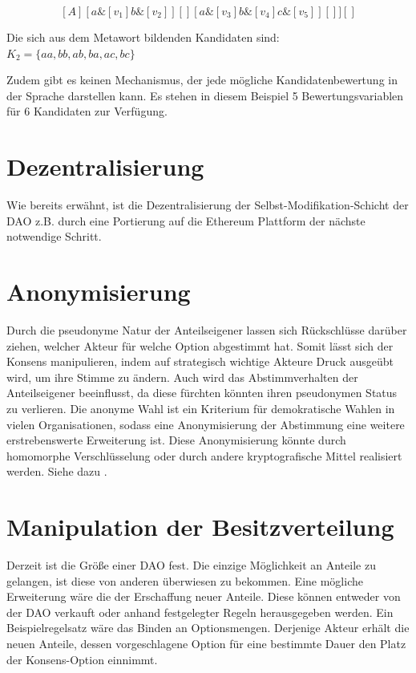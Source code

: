 \documentclass[a4paper,12pt]{report}
\begin{document}
\[ [A][ a\&[v_1]b\&[v_2] ][][ a\&[v_3]b\&[v_4]c\&[v_5] ][] ][] \] 


Die sich aus dem Metawort bildenden Kandidaten sind: $K_2=\{ aa, bb, ab, ba, ac, bc \}$

Zudem gibt es keinen Mechanismus, der jede mögliche Kandidatenbewertung in der Sprache darstellen kann. Es stehen in diesem Beispiel 5 Bewertungsvariablen für 6 Kandidaten zur Verfügung. 

\section{Dezentralisierung}
Wie bereits erwähnt, ist die Dezentralisierung der Selbst-Modifikation-Schicht der DAO z.B. durch eine Portierung auf die Ethereum Plattform der nächste notwendige Schritt.

\section{Anonymisierung}
Durch die pseudonyme Natur der Anteilseigener lassen sich Rückschlüsse darüber ziehen, welcher Akteur für welche Option abgestimmt hat. Somit lässt sich der Konsens manipulieren, indem auf strategisch wichtige Akteure Druck ausgeübt wird, um ihre Stimme zu ändern. Auch wird das Abstimmverhalten der Anteilseigener beeinflusst, da diese fürchten könnten ihren pseudonymen Status zu verlieren. Die anonyme Wahl ist ein Kriterium für demokratische Wahlen in vielen Organisationen, sodass eine Anonymisierung der Abstimmung eine weitere erstrebenswerte Erweiterung ist. Diese Anonymisierung könnte durch homomorphe Verschlüsselung\cite{Gentry2009} oder durch andere kryptografische Mittel realisiert werden. Siehe dazu \cite{Fouard2007a}.

\section{Manipulation der Besitzverteilung}
Derzeit ist die Größe einer DAO fest. Die einzige Möglichkeit an Anteile zu gelangen, ist diese von anderen überwiesen zu bekommen. Eine mögliche Erweiterung wäre die der Erschaffung neuer Anteile. Diese können entweder von der DAO verkauft oder anhand festgelegter Regeln herausgegeben werden. Ein Beispielregelsatz wäre das Binden an Optionsmengen. Derjenige Akteur erhält die neuen Anteile, dessen vorgeschlagene Option für eine bestimmte Dauer den Platz der Konsens-Option einnimmt.





\newpage

\nocite{Otto}
\nocite{Vasant2015}



\end{document}
